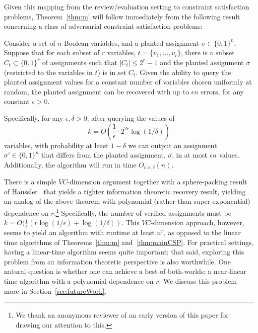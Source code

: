 \documentclass[anon,12pt]{colt2018}
\newcommand{\eps}{\epsilon}
\begin{document}
Given this mapping from the review/evaluation setting to constraint satisfaction problems, Theorem~\ref{thm:m} will follow immediately from the following result concerning a class of adversarial constraint satisfaction problems:%

\begin{theorem}\label{thm:mainCSP}
Consider a set of $n$ Boolean variables, and a planted assignment $\sigma\in \{0,1\}^n.$  Suppose that for each subset of $r$ variables, $t=\{v_1,\ldots,v_r\}$, there is a subset $C_t \subset \{0,1\}^r$ of assignments such that $|C_t| \le 2^r -1$ and the planted assignment $\sigma$ (restricted to the variables in $t$) is in set $C_t$.  Given the ability to query the planted assignment values for a constant number of variables chosen uniformly at random, the planted assignment can be recovered with up to $\eps n$ errors, for any constant $\eps>0$.  

Specifically, for any $\eps,\delta>0$,  after querying the values of $$k =\tilde{O}\left(\frac{1}{\eps} \cdot 2^{2r} \log(1/\delta)\right)$$ variables, with probability at least $1-\delta$ we can output an assignment $\sigma' \in \{0,1\}^n$ that differs from the planted assignment, $\sigma$, in at most $\eps n$ values.  Additionally, the algorithm will run in time $O_{r,\eps,\delta}(n).$
\end{theorem}



There is a simple $VC$-dimension argument together with a sphere-packing result of Haussler~\cite{haussler1995sphere} that yields a tighter information theoretic recovery result, yielding an analog of the above theorem with polynomial (rather than super-exponential) dependence on $r$.\footnote{We thank an anonymous reviewer of an early version of this paper for drawing our attention to this.}  Specifically, the number of verified assignments must be  $k = O(\frac{1}{\eps}\left(r\log(1/\eps)+\log(1/\delta)\right)$.  This $VC$-dimension approach, however, seems to yield an algorithm with runtime at least $n^r$, as opposed to the linear time algorithms of Theorems~\ref{thm:m} and~\ref{thm:mainCSP}.  For practical settings, having a linear-time algorithm seems quite important; that said, exploring this problem from an information theoretic perspective is also worthwhile.    One natural question is whether one can achieve a best-of-both-worlds: a near-linear time algorithm with a polynomial dependence on $r$.  We discuss this problem more in Section~\ref{sec:futureWork}.
\end{document}
